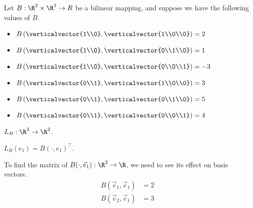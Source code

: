 \documentclass{ximera}
\begin{document}
\begin{question}
  Let  $B:\R^2 \times \R^3 \to R$ be a bilinear mapping, and suppose we have the following values of $B$.
  \begin{itemize}
  \item $B\left(\verticalvector{1\\0},\verticalvector{1\\0\\0}\right) = 2$
  \item $B\left(\verticalvector{1\\0},\verticalvector{0\\1\\0}\right) = 1$
  \item $B\left(\verticalvector{1\\0},\verticalvector{0\\0\\1}\right) = -3$
  \item $B\left(\verticalvector{0\\1},\verticalvector{1\\0\\0}\right) = 3$
  \item $B\left(\verticalvector{0\\1},\verticalvector{0\\1\\0}\right) = 5$
  \item $B\left(\verticalvector{0\\1},\verticalvector{0\\0\\1}\right) = 4$ 
  \end{itemize}
			
  \begin{solution}
    \begin{hint}
      $L_B:\R^3 \to \R^2$.
    \end{hint}
    \begin{hint}
      $L_B(e_1) = B(\cdot, e_1)^\top$.
    \end{hint}
    \begin{hint}
      To find the matrix of $B(\cdot,\vec{e}_1):\R^2 \to \R$, we need to see its effect on basis vectors.
      \begin{align*}
        B(\vec{e}_1,\vec{e}_1) &= 2\\
        B(\vec{e}_2,\vec{e}_1) &=3
      \end{align*}
      

\end{hint}
\end{solution}
\end{question}
\end{document}
